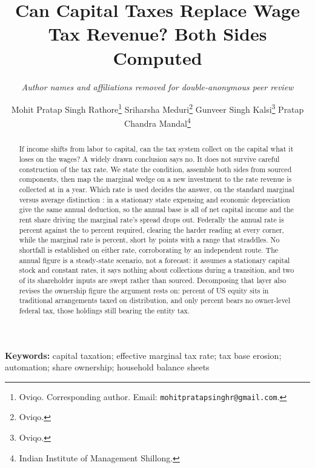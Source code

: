 \documentclass[11pt]{article}
\title{\bfseries Can Capital Taxes Replace Wage Tax Revenue? Both Sides
Computed}
\author{\normalsize\itshape Author names and affiliations removed for double-anonymous peer review}
\author{%
    Mohit Pratap Singh Rathore\thanks{Oviqo. Corresponding author. Email:
      \texttt{mohitpratapsinghr@gmail.com}.}\quad
    Sriharsha Meduri\thanks{Oviqo.}\quad
    Gunveer Singh Kalsi\thanks{Oviqo.}%
    \ifthreeauth\else\quad
    Pratap Chandra Mandal\thanks{Indian Institute of Management Shillong.}\fi}
\date{}
\theoremstyle{definition}
\begin{document}
\maketitle

\begin{abstract}
\noindent
If income shifts from labor to capital, can the tax system collect on the capital what it loses
on the wages? A widely drawn conclusion says no. It does not survive careful construction of the
tax rate. We state the condition, assemble both sides from sourced components, then map the
marginal wedge on a new investment to the rate revenue is collected at in a year. Which rate is used decides the answer, on the standard marginal versus average distinction
\citep{DevereuxGriffith2003}: in a stationary state expensing and economic depreciation give the
same annual deduction, so the annual base is all of net capital income and the rent share driving
the marginal rate's spread drops out. Federally the annual rate is  percent
against the  to  percent required, clearing the
harder reading at every corner, while the marginal rate is  percent, short
by  points with a range that straddles. No shortfall is established on either
rate, corroborating \citet{HotteTheodorakopoulosKoutroumpis2024} by an independent route. The annual figure is a
steady-state scenario, not a forecast: it assumes a stationary capital stock and constant rates,
it says nothing about collections during a transition, and two of its shareholder inputs are
swept rather than sourced. Decomposing that layer also revises the ownership figure the argument rests
on:  percent of US equity sits in traditional arrangements taxed on
distribution, and only  percent bears no owner-level federal tax, those
holdings still bearing the entity tax.
\end{abstract}

\vspace{0.5em}
\noindent\textbf{Keywords:} capital taxation; effective marginal tax rate; tax base erosion;
automation; share ownership; household balance sheets

\vspace{1em}






\end{document}
